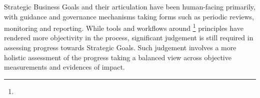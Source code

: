 %
%

Strategic Business Goals and their articulation have been human-facing primarily,
with guidance and governance mechanisms taking forms such as periodic reviews, monitoring and reporting.
While tools and workflows around \footnote{} principles have rendered more objectivity
in the process, significant judgement is still required in assessing progress towards Strategic Goals.
Such judgement involves a more holistic assessment of the progress taking a balanced view across objective measurements
and evidences of impact.
